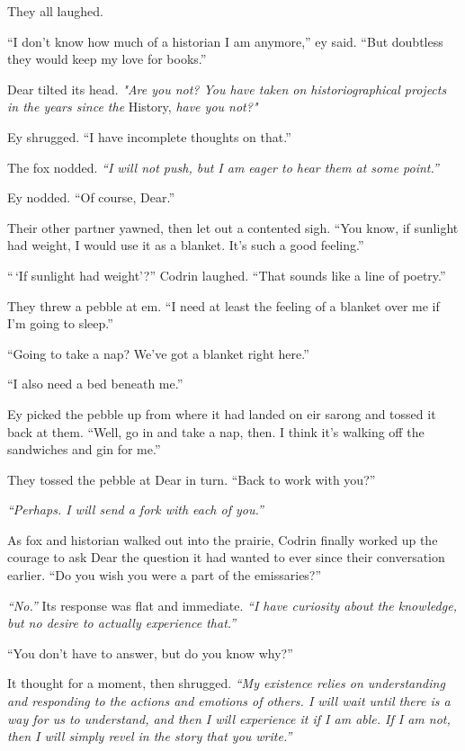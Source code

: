 They all laughed.

``I don't know how much of a historian I am anymore,'' ey said. ``But doubtless they would keep my love for books.''

Dear tilted its head. \emph{"Are you not? You have taken on historiographical projects in the years since the} History, \emph{have you not?"}

Ey shrugged. ``I have incomplete thoughts on that.''

The fox nodded. \emph{``I will not push, but I am eager to hear them at some point.''}

Ey nodded. ``Of course, Dear.''

Their other partner yawned, then let out a contented sigh. ``You know, if sunlight had weight, I would use it as a blanket. It's such a good feeling.''

``\,`If sunlight had weight'?'' Codrin laughed. ``That sounds like a line of poetry.''

They threw a pebble at em. ``I need at least the feeling of a blanket over me if I'm going to sleep.''

``Going to take a nap? We've got a blanket right here.''

``I also need a bed beneath me.''

Ey picked the pebble up from where it had landed on eir sarong and tossed it back at them. ``Well, go in and take a nap, then. I think it's walking off the sandwiches and gin for me.''

They tossed the pebble at Dear in turn. ``Back to work with you?''

\emph{``Perhaps. I will send a fork with each of you.''}

As fox and historian walked out into the prairie, Codrin finally worked up the courage to ask Dear the question it had wanted to ever since their conversation earlier. ``Do you wish you were a part of the emissaries?''

\emph{``No.''} Its response was flat and immediate. \emph{``I have curiosity about the knowledge, but no desire to actually experience that.''}

``You don't have to answer, but do you know why?''

It thought for a moment, then shrugged. \emph{``My existence relies on understanding and responding to the actions and emotions of others. I will wait until there is a way for us to understand, and then I will experience it if I am able. If I am not, then I will simply revel in the story that you write.''}

